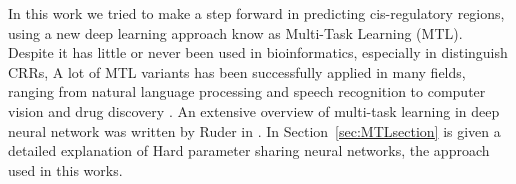 In this work we tried to make a step forward in predicting cis-regulatory
regions, using a new deep learning approach know as Multi-Task Learning
(MTL). Despite it has little or never been used in bioinformatics,
especially in distinguish CRRs, A lot of MTL variants has been successfully applied in many
fields, ranging from natural language processing \cite{CollobertWeston2008} and speech recognition \cite{Deng2013} to computer vision \cite{Girshick2015} and drug discovery \cite{Ramsundar2015}. An extensive overview of multi-task learning in deep neural network was written by Ruder in \cite{Ruder2017}. In Section~\ref{sec:MTLsection} is given a detailed explanation of Hard parameter sharing neural networks, the approach used in this works.
